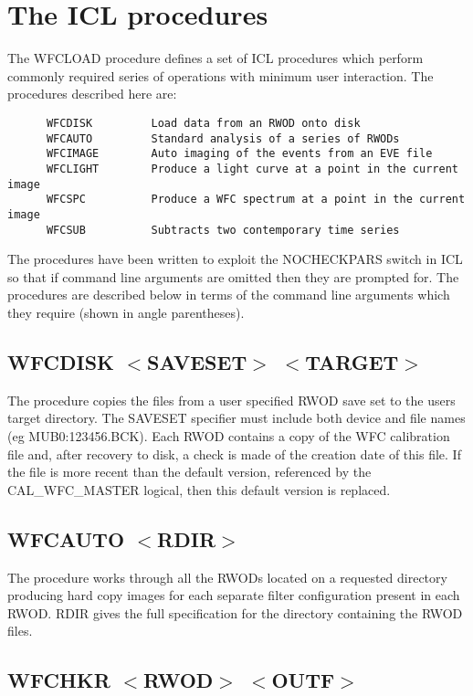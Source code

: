 \section{The ICL procedures}

The WFCLOAD procedure defines a set of ICL procedures which perform
commonly required series of operations with minimum user interaction.
The procedures described here are:

\begin{verbatim}
      WFCDISK         Load data from an RWOD onto disk
      WFCAUTO         Standard analysis of a series of RWODs
      WFCIMAGE        Auto imaging of the events from an EVE file
      WFCLIGHT        Produce a light curve at a point in the current image
      WFCSPC          Produce a WFC spectrum at a point in the current image
      WFCSUB          Subtracts two contemporary time series
\end{verbatim}

The procedures have been written to exploit the NOCHECKPARS switch in ICL
so that if command line arguments are omitted then they are prompted
for. 
The procedures are described below in terms of the command line arguments
which they require (shown in angle parentheses).

\subsection{WFCDISK $<$SAVESET$>$ $<$TARGET$>$}

The procedure copies the files from a user specified RWOD save set 
to the users target directory. The SAVESET specifier must include both device
and file names (eg MUB0:123456.BCK). Each RWOD contains a copy of the
WFC calibration file and, after recovery to disk, a check is made of the
creation date of this file. If the file is more recent than the default
version, referenced by the CAL\_WFC\_MASTER logical, then this default
version is replaced.

\subsection{WFCAUTO $<$RDIR$>$}

The procedure works through all the RWODs located on a requested directory
producing hard copy images for each separate filter configuration present
in each RWOD. RDIR gives the full specification for the directory
containing the RWOD files.

\subsection{WFCHKR $<$RWOD$>$ $<$OUTF$>$}

